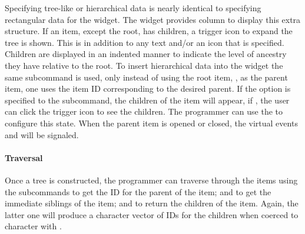 Specifying tree-like or hierarchical data is nearly identical to
specifying rectangular data for the  widget.  The
widget provides column  to display this extra structure. If
an item, except the root, has children, a trigger icon to expand the
tree is shown. This is in addition to any text and/or an icon that is
specified. Children are displayed in an indented manner to indicate
the level of ancestry they have relative to the root.  To insert
hierarchical data into the widget the same
 subcommand is used, only instead of
using the root item, \qcode{}, as the parent item, one uses the item
ID corresponding to the desired parent. If the option 
is specified to the  subcommand, the children of the item
will appear, if , the user can click the trigger icon to
see the children. The programmer can use the
 to configure this state. When the
parent item is opened or closed, the virtual events
 and  will be
signaled.



\paragraph{Traversal}
Once a tree is constructed, the programmer can traverse
through the items using the subcommands
 to get the ID for the parent of the
item;  and
 to get the immediate siblings of the
item; and  to return the children of
the item. Again, the latter one will produce a character vector of  IDs for the
children when coerced to character with .



